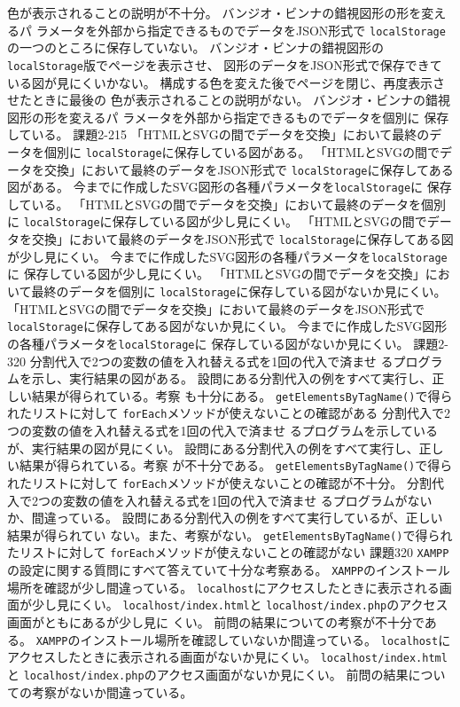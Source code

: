 \documentclass[a4j]{jreport}
\begin{document}
{{{	色が表示されることの説明が不十分。}
	{バンジオ・ビンナの錯視図形の形を変えるパ
				ラメータを外部から指定できるものでデータをJSON形式で
				\texttt{localStorage}の一つのところに保存していない。}
}
{
	{バンジオ・ビンナの錯視図形の\texttt{localStorage}版でページを表示させ、
	図形のデータをJSON形式で保存できている図が見にくいかない。}
	{構成する色を変えた後でページを閉じ、再度表示させたときに最後の
	色が表示されることの説明がない。}
	{バンジオ・ビンナの錯視図形の形を変えるパ
				ラメータを外部から指定できるものでデータを個別に
				保存している。}
}
{\ResultA}
{課題2-2}{15}
{
 {「HTMLとSVGの間でデータを交換」において最終のデータを個別に
 \texttt{localStorage}に保存している図がある。}
 {「HTMLとSVGの間でデータを交換」において最終のデータをJSON形式で
 \texttt{localStorage}に保存してある図がある。}
 {今までに作成したSVG図形の各種パラメータを\texttt{localStorage}に
				保存している。}
}
{
 {「HTMLとSVGの間でデータを交換」において最終のデータを個別に
 \texttt{localStorage}に保存している図が少し見にくい。}
 {「HTMLとSVGの間でデータを交換」において最終のデータをJSON形式で
 \texttt{localStorage}に保存してある図が少し見にくい。}
 {今までに作成したSVG図形の各種パラメータを\texttt{localStorage}に
				保存している図が少し見にくい。}
}
{
 {「HTMLとSVGの間でデータを交換」において最終のデータを個別に
 \texttt{localStorage}に保存している図がないか見にくい。}
 {「HTMLとSVGの間でデータを交換」において最終のデータをJSON形式で
 \texttt{localStorage}に保存してある図がないか見にくい。}
 {今までに作成したSVG図形の各種パラメータを\texttt{localStorage}に
				保存している図がないか見にくい。}
}
{\ResultA}
{課題2-3}{20}
{
  {分割代入で2つの変数の値を入れ替える式を1回の代入で済ませ
				るプログラムを示し、実行結果の図がある。}
  {設問にある分割代入の例をすべて実行し、正しい結果が得られている。考察
	も十分にある。}
	{\texttt{getElementsByTagName()}で得られたリストに対して
	\texttt{forEach}メソッドが使えないことの確認がある}
}
{
  {分割代入で2つの変数の値を入れ替える式を1回の代入で済ませ
				るプログラムを示しているが、実行結果の図が見にくい。}
  {設問にある分割代入の例をすべて実行し、正しい結果が得られている。考察
	が不十分である。}
	{\texttt{getElementsByTagName()}で得られたリストに対して
	\texttt{forEach}メソッドが使えないことの確認が不十分。}
}
{
  {分割代入で2つの変数の値を入れ替える式を1回の代入で済ませ
				るプログラムがないか、間違っている。}
  {設問にある分割代入の例をすべて実行しているが、正しい結果が得られてい
	ない。また、考察がない。}
	{\texttt{getElementsByTagName()}で得られたリストに対して
	\texttt{forEach}メソッドが使えないことの確認がない}
}
{\ResultEI}
{課題3}{20}
{
{\texttt{XAMPP}の設定に関する質問にすべて答えていて十分な考察ある。}
}
{
{\texttt{XAMPP}のインストール場所を確認が少し間違っている。}
{ \texttt{localhost}にアクセスしたときに表示される画面が少し見にくい。}
{\texttt{localhost/index.html}と
       \texttt{localhost/index.php}のアクセス画面がともにあるが少し見に
			 くい。}
{前問の結果についての考察が不十分である。}
}
{
{\texttt{XAMPP}のインストール場所を確認していないか間違っている。}
{ \texttt{localhost}にアクセスしたときに表示される画面がないか見にくい。}
{\texttt{localhost/index.html}と
       \texttt{localhost/index.php}のアクセス画面がないか見にくい。}
{前問の結果についての考察がないか間違っている。}
}
{\ResultEFI}
}
\end{document}
